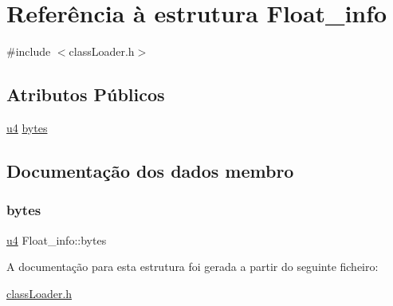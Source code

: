 \hypertarget{struct_float__info}{}\section{Referência à estrutura Float\+\_\+info}
\label{struct_float__info}


{\ttfamily \#include $<$class\+Loader.\+h$>$}

\subsection*{Atributos Públicos}
\begin{DoxyCompactItemize}
\item 
\hyperlink{util_8h_ae391a1d79bb0c8cbc283f0283e3c098b}{u4} \hyperlink{struct_float__info_ac133d07a0086fc5b388a47e256afcbab}{bytes}
\end{DoxyCompactItemize}


\subsection{Documentação dos dados membro}
\mbox{\label{struct_float__info_ac133d07a0086fc5b388a47e256afcbab}} 
\subsubsection{\texorpdfstring{bytes}{bytes}}
{\footnotesize\ttfamily \hyperlink{util_8h_ae391a1d79bb0c8cbc283f0283e3c098b}{u4} Float\+\_\+info\+::bytes}



A documentação para esta estrutura foi gerada a partir do seguinte ficheiro\+:\begin{DoxyCompactItemize}
\item 
\hyperlink{class_loader_8h}{class\+Loader.\+h}\end{DoxyCompactItemize}
